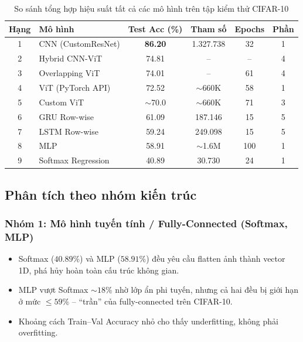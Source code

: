 \documentclass[a4paper]{article}
\theoremstyle{definition}
\begin{document}
\begin{table}[H]
	\centering
	\caption{So sánh tổng hợp hiệu suất tất cả các mô hình trên tập kiểm thử CIFAR-10}
	\footnotesize
	\begin{tabular}{|c|l|c|c|c|c|}
		\hline
		\textbf{Hạng} & \textbf{Mô hình} & \textbf{Test Acc (\%)} & \textbf{Tham số} & \textbf{Epochs} & \textbf{Phần} \\ \hline
		1 & CNN (CustomResNet)        & \textbf{86.20} & 1.327.738 & 32  & 1 \\ \hline
		2 & Hybrid CNN-ViT            & 74.81          & --        & --  & 4 \\ \hline
		3 & Overlapping ViT           & 74.01          & --        & 61  & 4 \\ \hline
		4 & ViT (PyTorch API)         & 72.52          & $\sim$660K & 58 & 1 \\ \hline
		5 & Custom ViT                & $\sim$70.0     & $\sim$660K & 71 & 3 \\ \hline
		6 & GRU Row-wise              & 61.09          & 187.146   & 15  & 5 \\ \hline
		7 & LSTM Row-wise             & 59.24          & 249.098   & 15  & 5 \\ \hline
		8 & MLP                       & 58.91          & $\sim$1.6M & 100 & 1 \\ \hline
		9 & Softmax Regression        & 40.89          & 30.730    & 24  & 1 \\ \hline
	\end{tabular}
	\label{tab:all-comparison}
\end{table}

\subsection{Phân tích theo nhóm kiến trúc}

\subsubsection{Nhóm 1: Mô hình tuyến tính / Fully-Connected (Softmax, MLP)}
\begin{itemize}
	\item Softmax ($40.89\%$) và MLP ($58.91\%$) đều yêu cầu flatten ảnh thành vector 1D, phá hủy hoàn toàn cấu trúc không gian.
	\item MLP vượt Softmax $\sim 18\%$ nhờ lớp ẩn phi tuyến, nhưng cả hai đều bị giới hạn ở mức $\leq 59\%$ -- ``trần'' của fully-connected trên CIFAR-10.
	\item Khoảng cách Train--Val Accuracy nhỏ cho thấy underfitting, không phải overfitting.
\end{itemize}
\end{document}
